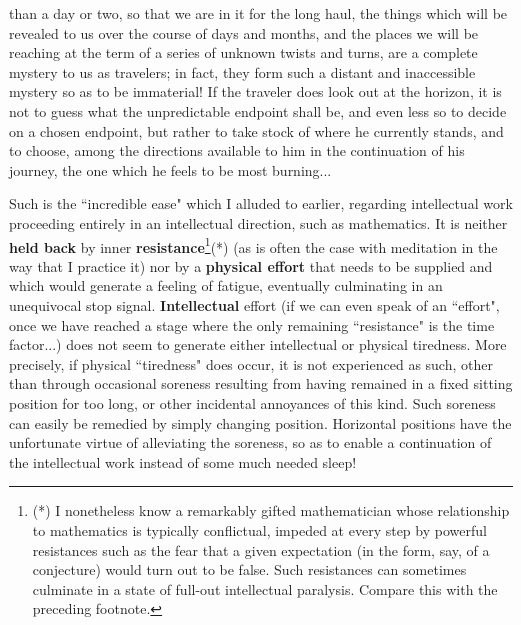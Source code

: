 than a day or two, so that we are in it for the long haul, the things which will be revealed to us over the course of days and months, and the places we will be reaching at the term of a series of unknown twists and turns, are a complete mystery to us as travelers; in fact, they form such a distant and inaccessible mystery so as to be immaterial! If the traveler does look out at the horizon, it is not to guess what the unpredictable endpoint shall be, and even less so to decide on a chosen endpoint, but rather to take stock of where he currently stands, and to choose, among the directions available to him in the continuation of his journey, the one which he feels to be most burning...

Such is the ``incredible ease" which I alluded to earlier, regarding intellectual work proceeding entirely in an intellectual direction, such as mathematics. It is neither \textbf{held back} by inner \textbf{resistance}\footnote{(*) I nonetheless know a remarkably gifted mathematician whose relationship to mathematics is typically conflictual, impeded at every step by powerful resistances such as the fear that a given expectation (in the form, say, of a conjecture) would turn out to be false. Such resistances can sometimes culminate in a state of full-out intellectual paralysis. Compare this with the preceding footnote.}(*) (as is often the case with meditation in the way that I practice it) nor by a \textbf{physical effort} that needs to be supplied and which would generate a feeling of fatigue, eventually culminating in an unequivocal stop signal. \textbf{Intellectual} effort (if we can even speak of an ``effort", once we have reached a stage where the only remaining ``resistance" is the time factor...) does not seem to generate either intellectual or physical tiredness. More precisely, if physical ``tiredness" does occur, it is not experienced as such, other than through occasional soreness resulting from having remained in a fixed sitting position for too long, or other incidental annoyances of this kind. Such soreness can easily be remedied by simply changing position. Horizontal positions have the unfortunate virtue of alleviating the soreness, so as to enable a continuation of the intellectual work instead of some much needed sleep!

